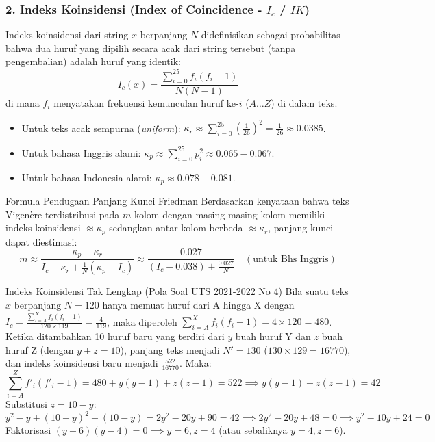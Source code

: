 \documentclass[11pt,a4paper]{article}
\begin{document}
\subsubsection{2. Indeks Koinsidensi (Index of Coincidence - $I_c$ / $IK$)}
Indeks koinsidensi dari string $x$ berpanjang $N$ didefinisikan sebagai probabilitas bahwa dua huruf yang dipilih secara acak dari string tersebut (tanpa pengembalian) adalah huruf yang identik:
\[
I_c(x) = \frac{\sum_{i=0}^{25} f_i (f_i - 1)}{N(N - 1)}
\]
di mana $f_i$ menyatakan frekuensi kemunculan huruf ke-$i$ ($A \dots Z$) di dalam teks.
\begin{itemize}[leftmargin=*]
    \item Untuk teks acak sempurna (\textit{uniform}): $\kappa_r \approx \sum_{i=0}^{25} \left(\frac{1}{26}\right)^2 = \frac{1}{26} \approx 0.0385$.
    \item Untuk bahasa Inggris alami: $\kappa_p \approx \sum_{i=0}^{25} p_i^2 \approx 0.065 - 0.067$.
    \item Untuk bahasa Indonesia alami: $\kappa_p \approx 0.078 - 0.081$.
\end{itemize}

\begin{thmbox}{Formula Pendugaan Panjang Kunci Friedman}
Berdasarkan kenyataan bahwa teks Vigen\`ere terdistribusi pada $m$ kolom dengan masing-masing kolom memiliki indeks koinsidensi $\approx \kappa_p$ sedangkan antar-kolom berbeda $\approx \kappa_r$, panjang kunci dapat diestimasi:
\[
m \approx \frac{\kappa_p - \kappa_r}{I_c - \kappa_r + \frac{1}{N}(\kappa_p - I_c)} \approx \frac{0.027}{(I_c - 0.038) + \frac{0.027}{N}} \quad (\text{untuk Bhs Inggris})
\]
\end{thmbox}

\begin{perhatianbox}{Indeks Koinsidensi Tak Lengkap (Pola Soal UTS 2021-2022 No 4)}
Bila suatu teks $x$ berpanjang $N = 120$ hanya memuat huruf dari A hingga X dengan $I_c = \frac{\sum_{i=A}^X f_i(f_i-1)}{120 \times 119} = \frac{4}{119}$, maka diperoleh $\sum_{i=A}^X f_i(f_i-1) = 4 \times 120 = 480$.\\
Ketika ditambahkan 10 huruf baru yang terdiri dari $y$ buah huruf Y dan $z$ buah huruf Z (dengan $y + z = 10$), panjang teks menjadi $N' = 130$ ($130 \times 129 = 16770$), dan indeks koinsidensi baru menjadi $\frac{522}{16770}$. Maka:
\[
\sum_{i=A}^Z f'_i(f'_i-1) = 480 + y(y-1) + z(z-1) = 522 \implies y(y-1) + z(z-1) = 42
\]
Substitusi $z = 10 - y$:
\[
y^2 - y + (10-y)^2 - (10-y) = 2y^2 - 20y + 90 = 42 \implies 2y^2 - 20y + 48 = 0 \implies y^2 - 10y + 24 = 0
\]
Faktorisasi $(y - 6)(y - 4) = 0 \implies y = 6, z = 4$ (atau sebaliknya $y = 4, z = 6$).
\end{perhatianbox}
\end{document}
